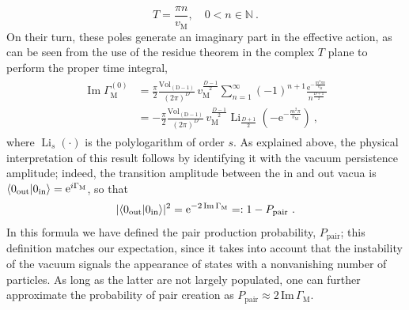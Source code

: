 \documentclass[12pt,a4paper]{article}
\numberwithin{equation}{section}
\numberwithin{equation}{section}
\begin{document}
\begin{equation} \label{poles}
 T=\frac{\pi n}{{v}_{\mathrm{M}}}, \quad 0<n \in \mathbb{N} \ .
\end{equation}
On their turn, these poles generate an imaginary part in the effective action, as can be seen from the use of the residue theorem in the complex $T$ plane to perform the proper time integral,
\begin{align}\label{eq:im_ea_0}
\begin{split}
\operatorname{Im} \Gamma^{(0)}_{\mathrm{M}}
 &=\frac{\pi}{2} \frac{\mathrm{Vol}_{\mathrm{(D-1)}}}{\left( 2\pi\right)^{D}} \, v_{\mathrm{M}}^{\frac{D-1}{2}} \sum_{n=1}^\infty (-1)^{n+1} \frac{\mathrm{e}^{-\frac{m^2 \pi n }{v_{\mathrm{M}}}}}{n^{\frac{D+1}{2}}}
 \\
 &=-\frac{\pi}{2} \frac{\mathrm{Vol}_{\mathrm{(D-1)}}}{\left( 2\pi\right)^{D}} \, v_{\mathrm{M}}^{\frac{D-1}{2}} \operatorname{Li}_{\frac{D+1}{2}}\left(-\mathrm{e}^{-\frac{m^2 \pi }{v_{\mathrm{M}}}}\right)\ ,
 \end{split} 
\end{align}
where $\operatorname{Li}_s (\cdot)$ is the polylogarithm of order ${s}$.
As explained above, the physical interpretation of this result follows by identifying it with the vacuum persistence amplitude; indeed, the transition amplitude between the in and out vacua is $\langle 0_{\rm out} \vert 0_{\rm in}\rangle={\rm e}^{i \Gamma_\mathrm{M}}$, so that
\begin{align}
 \vert\langle 0_{\rm out} \vert 0_{\rm in}\rangle\vert^2 ={\rm e}^{- 2\operatorname{Im} \Gamma_\mathrm{M}} =:1-P_{\mathrm{pair}}\ .
\end{align}
In this formula we have defined the pair production probability, $P_{\mathrm{pair}}$; this definition matches our expectation, since it takes into account that the instability of the vacuum signals the appearance of states with a nonvanishing number of particles. As long as the latter are not largely populated, one can further approximate the probability of pair creation as
$P_{\mathrm{pair}} \approx 2 \, \mathrm{Im} \,\Gamma_{\mathrm{M}}$.


\end{document}
